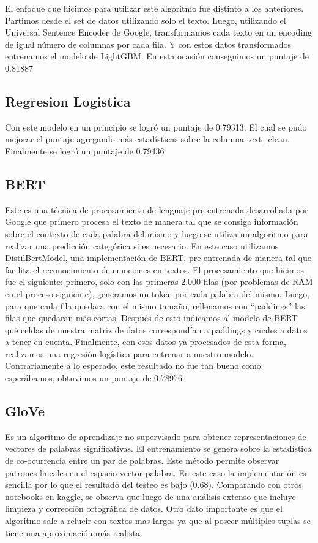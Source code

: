 \documentclass[12pt]{article}
\begin{document}
El enfoque que hicimos para utilizar este algoritmo fue distinto a los anteriores. Partimos desde el set de datos utilizando solo el texto. Luego, utilizando el Universal Sentence Encoder de Google, transformamos cada texto en un encoding de igual número de columnas por cada fila.
Y con estos datos transformados entrenamos el modelo de LightGBM. En esta ocasión conseguimos un puntaje de 0.81887

\subsection{Regresion Logistica}
Con este modelo en un principio se logró un puntaje de 0.79313. El cual se pudo mejorar el puntaje agregando más estadísticas sobre la columna text\_clean. Finalmente se logró un puntaje de 0.79436


\subsection{BERT}
Este es una técnica de procesamiento de lenguaje pre entrenada desarrollada por Google que primero procesa el texto de manera tal que se consiga información sobre el contexto de cada palabra del mismo y luego se utiliza un algoritmo para realizar una predicción categórica si es necesario.
En este caso utilizamos DistilBertModel, una implementación de BERT, pre entrenada de manera tal que facilita el reconocimiento de emociones en textos.
El procesamiento que hicimos fue el siguiente: primero, solo con las primeras 2.000 filas (por problemas de RAM en el proceso siguiente), generamos un token por cada palabra del mismo. 
Luego, para que cada fila quedara con el mismo tamaño, rellenamos con “paddings” las filas que quedaran más cortas.
Después de esto indicamos al modelo de BERT qué celdas de nuestra matriz de datos correspondían a paddings y cuales  a datos a tener en cuenta.
Finalmente, con esos datos ya procesados de esta forma, realizamos una regresión logística para entrenar a nuestro modelo.
Contrariamente a lo esperado, este resultado no fue tan bueno como esperábamos, obtuvimos un puntaje de 0.78976.

\subsection{GloVe}
Es un algoritmo de aprendizaje no-supervisado para obtener representaciones de vectores de palabras significativas. El entrenamiento se genera sobre la estadística de co-ocurrencia entre un par de palabras. Este método permite observar patrones lineales en el espacio vector-palabra.
En este caso la implementación es sencilla por lo que el resultado del testeo es bajo (0.68). Comparando con otros notebooks en kaggle, se observa que luego de una análisis extenso que incluye limpieza y corrección ortográfica de datos.
Otro dato importante es que el algoritmo sale a relucir con textos mas largos ya que al poseer múltiples tuplas se tiene una aproximación más realista.
\end{document}
